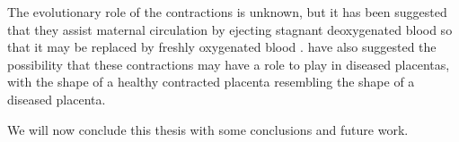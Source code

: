        The evolutionary role of the contractions is unknown, but it has been suggested that they assist maternal circulation by ejecting stagnant deoxygenated blood so that it may be replaced by freshly oxygenated blood \cite{dellschaftHaemodynamicsHumanPlacenta2020}. \citeauthor{dellschaftHaemodynamicsHumanPlacenta2020} \cite{dellschaftHaemodynamicsHumanPlacenta2020} have also suggested the possibility that these contractions may have a role to play in diseased placentas, with the shape of a healthy contracted placenta resembling the shape of a diseased placenta.

        We will now conclude this thesis with some conclusions and future work.